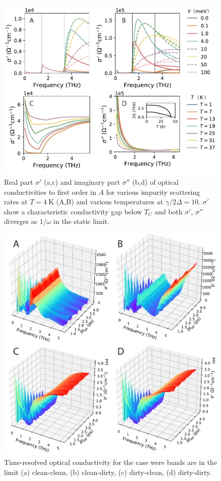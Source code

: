 \documentclass[aps,prb,reprint,noeprint,superscriptaddress]{revtex4-1}
\begin{document}
\begin{figure}[t]
	\centering
	\includegraphics[width=\columnwidth]{figures/m-fig1.pdf}
	\caption{Real part $\sigma'$ (a,c) and imaginary part $\sigma''$ (b,d)
		of optical conductivities to first order in $A$ 
	for various impurity scattering rates at $T=\SI{4}{\kelvin}$ (A,B) and
various temperatures at $\gamma/2\Delta=10$. $\sigma'$ show a characteristic
conductivity gap below $T_C$ and both $\sigma'$, $\sigma''$ diverges as
$1/\omega$ in the static limit.}
\label{fig:cond-lin2}
\end{figure}
\begin{figure}[t]
  \centering
  \includegraphics[width=\columnwidth]{figures/fig-cond-2d-fourcases}
  \caption{Time-resolved optical conductivity for the case were bands are in the
  limit (a) clean-clean, (b) clean-dirty, (c) dirty-clean, (d) dirty-dirty.}
\end{figure}
\end{document}
